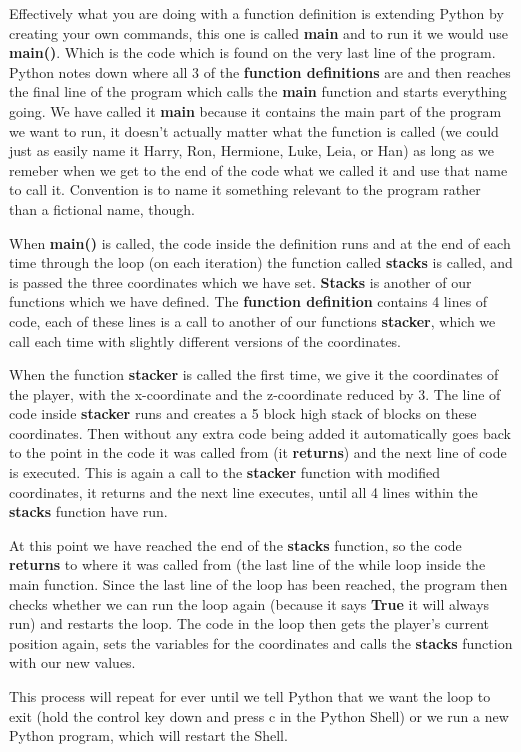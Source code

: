 \documentclass{geocraft-worksheet-multipage}
\begin{document}
\newpage

Effectively what you are doing with a function definition is
extending Python by creating your own commands, this one is called
\textbf{main} and to run it we would use \textbf{main()}. Which is the
code which is found on the very last line of the program. Python notes
down where all 3 of the \textbf{function definitions} are and then
reaches the final line of the program which calls the \textbf{main} function
and starts everything going. We have called it \textbf{main} because
it contains the main part of the program we want to run, it doesn't
actually matter what the function is called (we could just as easily
name it Harry, Ron, Hermione, Luke, Leia, or Han) as long as we
remeber when we get to the end of the code what we called it and use
that name to call it. Convention is to name it something relevant to
the program rather than a fictional name, though. 
\vspace{0.5cm} 


When \textbf{main()} is called, the code inside the definition runs
and at the end of each time through the loop (on each iteration) the
function called \textbf{stacks} is called, and is passed the three
coordinates which we have set. \textbf{Stacks} is another of our
functions which we have defined. The \textbf{function definition}
contains 4 lines of code, each of these lines is a call to another
of our functions \textbf{stacker}, which we call each time with
slightly different versions of the coordinates.  \vspace{0.5cm}


When the function \textbf{stacker} is called the first time, we give it
the coordinates of the player, with the x-coordinate and the
z-coordinate reduced by 3. The line of code inside \textbf{stacker}
runs and creates a 5 block high stack of blocks on these
coordinates. Then without any extra code being added it automatically
goes back to the point in the code it was called from (it
\textbf{returns}) and the next line of code is executed. This is again
a call to the \textbf{stacker} function with modified coordinates, it
returns and the next line executes, until all 4 lines within the
\textbf{stacks} function have run.  \vspace{0.5cm}


At this point we have reached the end of the \textbf{stacks} function,
so the code \textbf{returns} to where it was called from (the last
line of the while loop inside the main function. Since the last line
of the loop has been reached, the program then checks whether we can
run the loop again (because it says \textbf{True} it will always run)
and restarts the loop. The code in the loop then gets the player's
current position again, sets the variables for the coordinates and
calls the \textbf{stacks} function with our new values.  \vspace{0.5cm}


This process will repeat for ever until we tell Python that we want
the loop to exit (hold the control key down and press c in the Python
Shell) or we run a new Python program, which will restart the Shell.
\vspace{0.5cm} 
\end{document}
